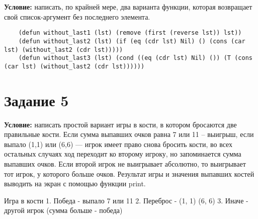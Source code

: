 \textbf{Условие:} написать, по крайней мере, два варианта функции, которая возвращает свой список-аргумент без последнего элемента.

\begin{lstlisting}
    (defun without_last1 (lst) (remove (first (reverse lst)) lst))
    (defun without_last2 (lst) (if (eq (cdr lst) Nil) () (cons (car lst) (without_last2 (cdr lst)))))
    (defun without_last3 (lst) (cond ((eq (cdr lst) Nil) ()) (T (cons (car lst) (without_last2 (cdr lst))))))
\end{lstlisting}


\section{Задание 5}

\textbf{Условие:} написать простой вариант игры в кости, в котором бросаются две правильные кости. Если сумма выпавших очков равна 7 или 11 -- выигрыш, если выпало (1,1) или (6,6) --- игрок имеет право снова бросить кости, во всех остальных случаях ход переходит ко второму игроку, но запоминается сумма выпавших очков. Если второй игрок не выигрывает абсолютно, то выигрывает тот игрок, у которого больше очков. Результат игры и значения выпавших костей выводить на экран с помощью функции print.

Игра в кости
1. Победа - выпало 7 или 11
2. Переброс - (1, 1) (6, 6)
3. Иначе - другой игрок (сумма больше - победа)


